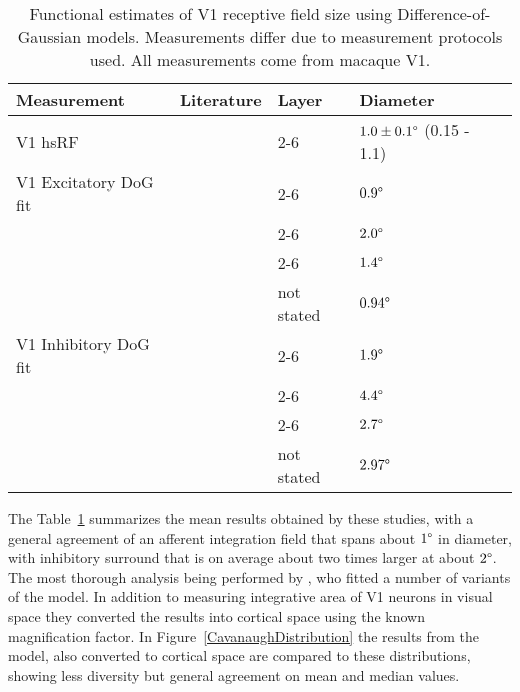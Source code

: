 \begin{table}
  \centering
  \begin{adjustbox}{width=1\textwidth}
  \begin{tabular}{l | l l l l}
    Measurement              & Literature            & Layer & Diameter \\
    \hline
    V1 hsRF                  & \cite{Levitt2002}     & 2-6 & $1.0 \pm 0.1\degree$ (0.15 - 1.1) \\
    \hline
    V1 Excitatory DoG fit    & \cite{Levitt2002}     & 2-6 & $0.9\degree$ \\
                             & \cite{Sceniak2001}    & 2-6 & $2.0\degree$ \\
                             & \cite{Cavanaugh2002}  & 2-6 & $1.4\degree$ \\
                             & \cite{Solomon2002}    & not stated & $0.94\degree$ \\
    \hline
    V1 Inhibitory DoG fit    & \cite{Levitt2002}     & 2-6 & $1.9\degree$ \\
                             & \cite{Sceniak2001}    & 2-6 & $4.4\degree$ \\
                             & \cite{Cavanaugh2002}  & 2-6 & $2.7\degree$ \\
                             & \cite{Solomon2002}    & not stated & $2.97\degree$ \\
    \hline
  \end{tabular}
  \end{adjustbox}
  \caption[Functional estimates of V1 receptive field size using
    Difference-of-Gaussian models.]{Functional estimates of V1
    receptive field size using Difference-of-Gaussian
    models. Measurements differ due to measurement protocols used. All
    measurements come from macaque V1.}
  \label{electrophystable}
\end{table}

The Table~\ref{electrophystable} summarizes the mean results obtained
by these studies, with a general agreement of an afferent integration
field that spans about $1\degree$ in diameter, with inhibitory
surround that is on average about two times larger at about
$2\degree$. The most thorough analysis being performed by
\cite{Cavanaugh2002}, who fitted a number of variants of the model. In
addition to measuring integrative area of V1 neurons in visual space
they converted the results into cortical space using the known
magnification factor. In Figure~\ref{CavanaughDistribution} the
results from the model, also converted to cortical space are compared
to these distributions, showing less diversity but general agreement
on mean and median values.

